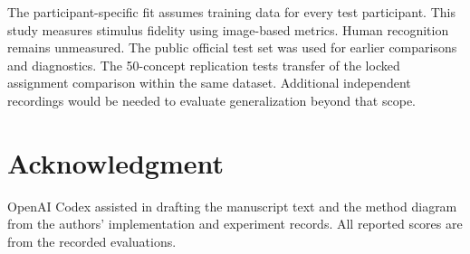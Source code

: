 \documentclass[letterpaper,10pt,conference]{IEEEtran}
\begin{document}
The participant-specific fit assumes training data for every test participant. This study measures stimulus fidelity using image-based metrics. Human recognition remains unmeasured. The public official test set was used for earlier comparisons and diagnostics. The 50-concept replication tests transfer of the locked assignment comparison within the same dataset. Additional independent recordings would be needed to evaluate generalization beyond that scope.

\section*{Acknowledgment}
OpenAI Codex assisted in drafting the manuscript text and the method diagram from the authors' implementation and experiment records. All reported scores are from the recorded evaluations.



\end{document}
